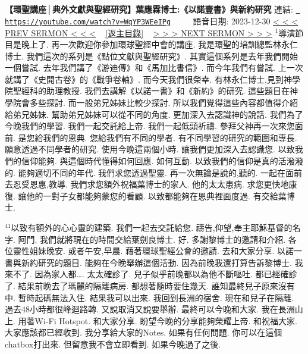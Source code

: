 \documentclass{book}
\begin{document}
\section{}
\label{sec:WqYP3WEeIPg}
\textbf{【環聖講座│典外文獻與聖經研究】葉應霖博士:《以諾壹書》與新約研究}
\newline
\newline
連結: \href{https://youtube.com/watch?v=WqYP3WEeIPg}{\texttt{ https://youtube.com/watch?v=WqYP3WEeIPg}} ~~~~ 語音日期: 2023-12-30 
\newline
\newline
\hyperref[sec:kGnhU90Nb7o]{\small{< < < PREV SERMON < < <}}
~
\hyperref[sec:index]{\small{[返主目錄]}}
~
\hyperref[sec:7wbezlnJO0Q]{\small{> > > NEXT SERMON > > >}}
\newline
\newline
$^{1}$導演節目是晚上了.
再一次歡迎你參加環球聖經中會的講座.
我是環聖的培訓總監林永仁博士.
我們這次的系列是《點位文獻與聖經研究》.
其實這個系列是去年我們開始一個嘗試.
去年我們講了《游迪傳》和《馬加比書信》.
而今年我們有嘗試.
上一次就講了《史開古卷》的《戰爭卷軸》.
而今天我們很榮幸.
有林永仁博士,見到神學院聖經科的助理教授.
我們去講解《以諾一書》和《新約》的研究.
這些題目在神學院會多些探討.
而一般弟兄姊妹比較少探討.
所以我們覺得這些內容都值得介紹給弟兄姊妹.
幫助弟兄姊妹可以從不同的角度.
更加深入去認識神的說話.
我們為了今晚我們的學習.
我們一起交託給上帝.
我們一起低頭祈禱.
參拜父神再一次來您面前.
是您給我們的恩典.
您給我們有不同的學者.
有不同學習的研究的範圍和專長.
願意透過不同學者的研究.
使用今晚這兩個小時.
讓我們更加深入去認識您.
以致我們的信仰能夠.
與這個時代懂得如何回應.
如何互動.
以致我們的信仰是真的活潑潑的.
能夠適切不同的年代.
我們求您透過聖靈.
再一次無論是說的,聽的.
一起在面前去忍受恩惠,教導.
我們求您額外祝福葉博士的家人.
他的太太患病.
求您更快地康復.
讓他的一對子女都能夠蒙您的看顧.
以致都能夠在恩典裡面度過.
有交給葉博士.

$^{41}$以致有額外的心心靈的建築.
我們一起去交託給您.
禱告,仰望,奉主耶穌基督的名字.
阿門.
我們就將現在的時間交給葉劍良博士.
好.
多謝黎博士的邀請和介紹.
各位靈性姐妹晚安.
或者午安,早晨.
藉著環球聖經公會的邀請.
去和大家分享.
以諾一書與新約研究的題目.
能夠在今晚舉辦這個活動.
因為前晚我還打算告訴黎博士.
我來不了.
因為家人都….
太太確診了.
兒子似乎前晚都以為他不斷嘔吐.
都已經確診了.
結果前晚去了瑪麗的隔離病房.
都想著隨時要住幾天.
誰知最終兒子原來沒有中.
暫時起碼無法入住.
結果我可以出來.
我回到長洲的宿舍.
現在和兒子在隔離.
過去48小時都很峰迴路轉.
又說取消又說要舉辦.
最終可以今晚和大家.
我在長洲山上.
用著Wi-Fi Hotspot.
和大家分享.
盼望今晚的分享能夠榮耀上帝.
和祝福大家.
大家應該都已經收到.
我分享給大家的Notes.
如果有任何問題.
你可以在這個chatbox打出來.
但留意我不會立即看到.
如果今晚過了之後.
\end{document}

